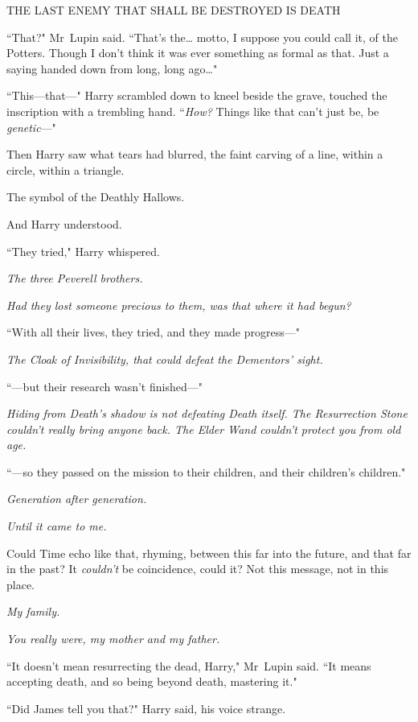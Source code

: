 \begin{center}
THE LAST ENEMY THAT SHALL BE DESTROYED IS DEATH
\end{center}

``That?" Mr~Lupin said. ``That's the{\ldots} motto, I suppose you could call it, of the Potters. Though I don't think it was ever something as formal as that. Just a saying handed down from long, long ago{\ldots}"

``This—that—" Harry scrambled down to kneel beside the grave, touched the inscription with a trembling hand. ``\emph{How?} Things like that can't just be, be \emph{genetic}—"

Then Harry saw what tears had blurred, the faint carving of a line, within a circle, within a triangle.

The symbol of the Deathly Hallows.

And Harry understood.

``They tried," Harry whispered.

\emph{The three Peverell brothers.}

\emph{Had they lost someone precious to them, was that where it had begun?}

``With all their lives, they tried, and they made progress—"

\emph{The Cloak of Invisibility, that could defeat the Dementors' sight.}

``—but their research wasn't finished—"

\emph{Hiding from Death's shadow is not defeating Death itself. The Resurrection Stone couldn't really bring anyone back. The Elder Wand couldn't protect you from old age.}

``—so they passed on the mission to their children, and their children's children."

\emph{Generation after generation.}

\emph{Until it came to me.}

Could Time echo like that, rhyming, between this far into the future, and that far in the past? It \emph{couldn't} be coincidence, could it? Not this message, not in this place.

\emph{My family.}

\emph{You really were, my mother and my father.}

``It doesn't mean resurrecting the dead, Harry," Mr~Lupin said. ``It means accepting death, and so being beyond death, mastering it."

``Did James tell you that?" Harry said, his voice strange.

